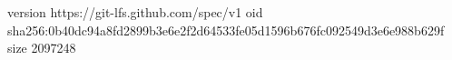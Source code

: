 version https://git-lfs.github.com/spec/v1
oid sha256:0b40dc94a8fd2899b3e6e2f2d64533fe05d1596b676fc092549d3e6e988b629f
size 2097248
